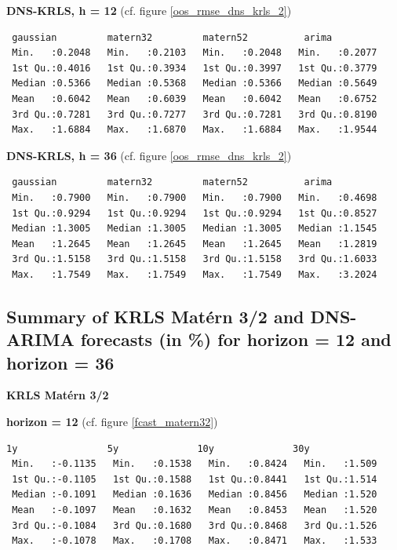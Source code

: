 \textbf{DNS-KRLS, h = 12} (cf. figure \ref{oos_rmse_dns_krls_2})

\begin{verbatim}
 gaussian         matern32         matern52          arima       
 Min.   :0.2048   Min.   :0.2103   Min.   :0.2048   Min.   :0.2077  
 1st Qu.:0.4016   1st Qu.:0.3934   1st Qu.:0.3997   1st Qu.:0.3779  
 Median :0.5366   Median :0.5368   Median :0.5366   Median :0.5649  
 Mean   :0.6042   Mean   :0.6039   Mean   :0.6042   Mean   :0.6752  
 3rd Qu.:0.7281   3rd Qu.:0.7277   3rd Qu.:0.7281   3rd Qu.:0.8190  
 Max.   :1.6884   Max.   :1.6870   Max.   :1.6884   Max.   :1.9544 
\end{verbatim}

\textbf{DNS-KRLS, h = 36} (cf. figure \ref{oos_rmse_dns_krls_2})

\begin{verbatim}
 gaussian         matern32         matern52          arima       
 Min.   :0.7900   Min.   :0.7900   Min.   :0.7900   Min.   :0.4698  
 1st Qu.:0.9294   1st Qu.:0.9294   1st Qu.:0.9294   1st Qu.:0.8527  
 Median :1.3005   Median :1.3005   Median :1.3005   Median :1.1545  
 Mean   :1.2645   Mean   :1.2645   Mean   :1.2645   Mean   :1.2819  
 3rd Qu.:1.5158   3rd Qu.:1.5158   3rd Qu.:1.5158   3rd Qu.:1.6033  
 Max.   :1.7549   Max.   :1.7549   Max.   :1.7549   Max.   :3.2024  
\end{verbatim}



\subsection{Summary of KRLS Mat\'ern 3/2 and DNS-ARIMA forecasts (in \%) for horizon = 12 and horizon = 36}
\label{appendix_summary_forecast}

\textbf{KRLS Mat\'ern 3/2}

\textbf{horizon = 12} (cf. figure \ref{fcast_matern32})

\begin{verbatim}
1y                5y              10y              30y       
 Min.   :-0.1135   Min.   :0.1538   Min.   :0.8424   Min.   :1.509  
 1st Qu.:-0.1105   1st Qu.:0.1588   1st Qu.:0.8441   1st Qu.:1.514  
 Median :-0.1091   Median :0.1636   Median :0.8456   Median :1.520  
 Mean   :-0.1097   Mean   :0.1632   Mean   :0.8453   Mean   :1.520  
 3rd Qu.:-0.1084   3rd Qu.:0.1680   3rd Qu.:0.8468   3rd Qu.:1.526  
 Max.   :-0.1078   Max.   :0.1708   Max.   :0.8471   Max.   :1.533
\end{verbatim}

